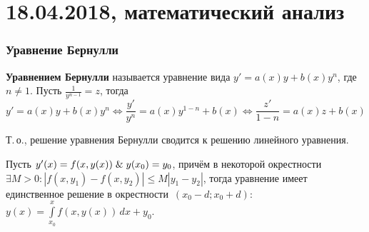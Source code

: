 \chapter{18.04.2018, математический анализ}
\subsection{Уравнение Бернулли}
\textbf{Уравнением Бернулли} называется уравнение вида $y' = a(x) y + b(x) y^n$, где~$n \neq 1$.
Пусть $\frac1{y^{n-1}} = z$, тогда
\begin{equation*}
y' = a(x) y + b(x) y^n \Leftrightarrow
\frac{y'}{y^n} = a(x) y^{1-n} + b(x) \Leftrightarrow
\frac{z'}{1 - n} = a(x) z + b(x)
\end{equation*}

Т.\,о., решение уравнения Бернулли сводится к решению линейного уравнения.

\begin{theorem}
Пусть $y'(x) = f(x, y(x)) \mathrel{\&} y(x_0) = y_0$, причём в некоторой окрестности $\exists M > 0 \colon |f(x, y_1) - f(x, y_2)| \leqslant M |y_1 - y_2|$, тогда уравнение имеет единственное решение в окрестности~$(x_0 - d; x_0 + d)$: $y(x) = \int\limits_{x_0}^x f(x, y(x))\,dx + y_0$.
\end{theorem}

